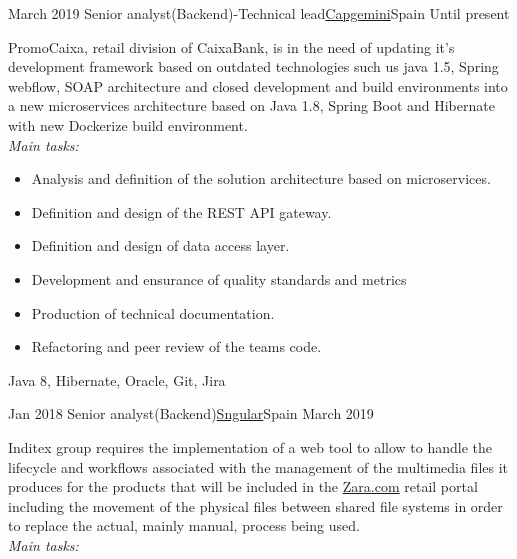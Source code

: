 %
%
%

\begin{experiences}

 \experience
    {March 2019} {Senior analyst(Backend)-Technical lead}{\href{https://www.capgemini.com/es-es/}{Capgemini}}{Spain}
    {Until present}    {

PromoCaixa, retail division of CaixaBank, is in the need of updating it's development framework based on outdated technologies such us java 1.5, Spring webflow, SOAP architecture and closed development and build environments into a new microservices architecture based on Java 1.8, Spring Boot and Hibernate with new Dockerize build environment.
\\
\emph{Main tasks:}
    	
                      \begin{itemize}
                        \item Analysis and definition of the solution architecture based on microservices.
                        \item Definition and design of the REST API gateway.
						 \item Definition and design of data access layer.
                        \item Development and ensurance of quality standards and metrics
                        \item Production of technical documentation.
                        \item Refactoring and peer review of the teams code.
                      \end{itemize}
                    }
                    {Java 8, Hibernate, Oracle, Git, Jira}
                    
  \emptySeparator


 \experience
    {Jan 2018} {Senior analyst(Backend)}{\href{https://sngular.com/}{Sngular}}{Spain}
    {March 2019}    {

Inditex group requires the implementation of a web tool to allow to handle the lifecycle and workflows associated with the management of the multimedia files it produces for the products that will be included in the {\href{http://Zara.com}{Zara.com}} retail portal including the movement of the physical files between shared file systems in order to replace the actual, mainly manual, process being used.
\\
\emph{Main tasks:}
    	
}
\end{experiences}
